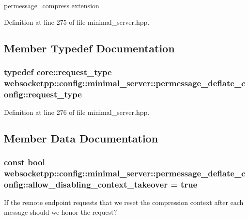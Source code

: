 permessage\+\_\+compress extension 

Definition at line 275 of file minimal\+\_\+server.\+hpp.



\subsection{Member Typedef Documentation}
\hypertarget{structwebsocketpp_1_1config_1_1minimal__server_1_1permessage__deflate__config_a3011304a1e8bf6893f946bfd41e967f6}{}
\subsubsection[{request\+\_\+type}]{\setlength{\rightskip}{0pt plus 5cm}typedef {\bf core\+::request\+\_\+type} {\bf websocketpp\+::config\+::minimal\+\_\+server\+::permessage\+\_\+deflate\+\_\+config\+::request\+\_\+type}}\label{structwebsocketpp_1_1config_1_1minimal__server_1_1permessage__deflate__config_a3011304a1e8bf6893f946bfd41e967f6}


Definition at line 276 of file minimal\+\_\+server.\+hpp.



\subsection{Member Data Documentation}
\hypertarget{structwebsocketpp_1_1config_1_1minimal__server_1_1permessage__deflate__config_a6e01239ebe19410d4214db6bd1b83d53}{}
\subsubsection[{allow\+\_\+disabling\+\_\+context\+\_\+takeover}]{\setlength{\rightskip}{0pt plus 5cm}const bool websocketpp\+::config\+::minimal\+\_\+server\+::permessage\+\_\+deflate\+\_\+config\+::allow\+\_\+disabling\+\_\+context\+\_\+takeover = true\hspace{0.3cm}{\ttfamily [static]}}\label{structwebsocketpp_1_1config_1_1minimal__server_1_1permessage__deflate__config_a6e01239ebe19410d4214db6bd1b83d53}
If the remote endpoint requests that we reset the compression context after each message should we honor the request? 

